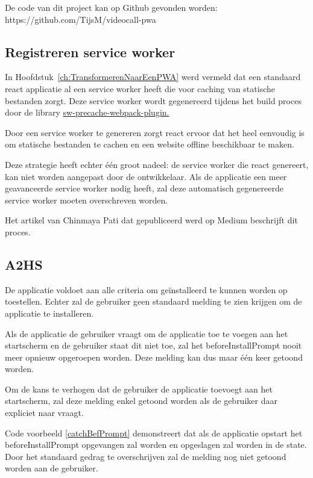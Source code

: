 	De code van dit project kan op Github gevonden worden: https://github.com/TijsM/videocall-pwa
	
	\subsection{Registreren service worker}
		
		In Hoofdstuk~\ref{ch:TransformerenNaarEenPWA} werd vermeld dat een standaard react applicatie al een service worker heeft die voor caching van statische bestanden zorgt. Deze service worker wordt gegenereerd tijdens het build proces door de library \href{https://github.com/goldhand/sw-precache-webpack-plugin}{sw-precache-webpack-plugin. }  
		\autocite{Mester2019}
		
		Door een service worker te genereren zorgt react ervoor dat het heel eenvoudig is om statische bestanden te cachen en een website offline beschikbaar te maken.
		
		Deze strategie heeft echter één groot nadeel: de service worker die react genereert, kan niet worden aangepast door de ontwikkelaar. Als de applicatie een meer geavanceerde service worker nodig heeft, zal deze automatisch gegenereerde service worker moeten overschreven worden.
		
		Het artikel van Chinmaya Pati dat gepubliceerd werd op Medium beschrijft dit proces. \autocite{Pati2019}
		
	\subsection{A2HS}
	
		De applicatie voldoet aan alle criteria om geïnstalleerd te kunnen worden op toestellen. Echter zal de gebruiker geen standaard melding te zien krijgen om de applicatie te installeren.		
		
		Als de applicatie de gebruiker vraagt om de applicatie toe te voegen aan het startscherm en de gebruiker staat dit niet toe, zal het beforeInstallPrompt nooit meer opnieuw opgeroepen worden. Deze melding kan dus maar één keer getoond worden.
		
		Om de kans te verhogen dat de gebruiker de applicatie toevoegt aan het startscherm, zal deze melding enkel getoond worden als de gebruiker daar expliciet naar vraagt.
		\autocite{Mclachlan2020}
		
		Code voorbeeld \ref{catchBefPrompt} demonstreert dat als de applicatie opstart het beforeInstallPrompt opgevangen zal worden en opgeslagen zal worden in de state. Door het standaard gedrag te overschrijven zal de melding nog niet getoond worden aan de gebruiker.
		\autocite{LePage2020b}
		
